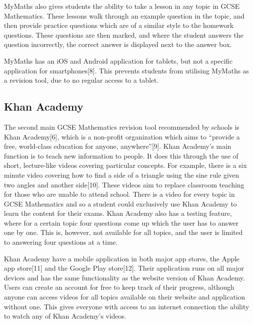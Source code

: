 \documentclass{article}
\begin{document}
MyMaths also gives students the ability to take a lesson in any topic in GCSE Mathematics. These lessons walk through an example question in the topic, and then provide practice questions which are of a similar style to the homework questions. These questions are then marked, and where the student answers the question incorrectly, the correct answer is displayed next to the answer box. \par

MyMaths has an iOS and Android application for tablets, but not a specific application for smartphones[8]. This prevents students from utilising MyMaths as a revision tool, due to no regular access to a tablet. \par

\subsection{Khan Academy}

The second main GCSE Mathematics revision tool recommended by schools is Khan Academy[6], which is a non-profit organization which aims to ``provide a free, world-class education for anyone, anywhere''[9]. Khan Academy's main function is to teach new information to people. It does this through the use of short, lecture-like videos covering particular concepts. For example, there is a six minute video covering how to find a side of a triangle using the sine rule given two angles and another side[10]. These videos aim to replace classroom teaching for those who are unable to attend school. There is a video for every topic in GCSE Mathematics and so a student could exclusively use Khan Academy to learn the content for their exams. Khan Academy also has a testing feature, where for a certain topic four questions come up which the user has to answer one by one. This is, however, not available for all topics, and the user is limited to answering four questions at a time. \par

Khan Academy have a mobile application in both major app stores, the Apple app store[11] and the Google Play store[12]. Their application runs on all major devices and has the same functionality as the website version of Khan Academy. Users can create an account for free to keep track of their progress, although anyone can access videos for all topics available on their website and application without one. This gives everyone with access to an internet connection the ability to watch any of Khan Academy's videos. \par
\end{document}
